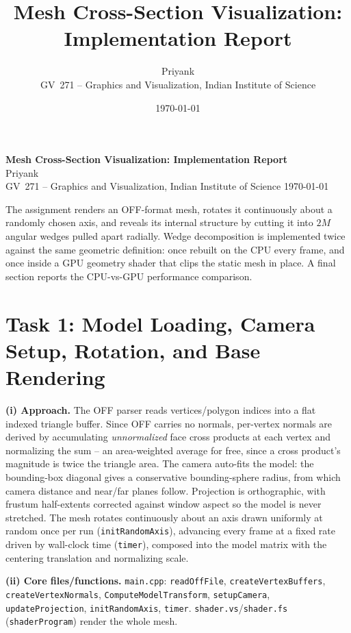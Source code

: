 \documentclass[10pt]{article}
\title{\vspace{-2em}\large Mesh Cross-Section Visualization: Implementation Report}
\author{\normalsize Priyank \\ \footnotesize GV~271 -- Graphics and Visualization, Indian Institute of Science}
\date{\footnotesize \today}
\begin{document}
\begin{center}
{\large\textbf{Mesh Cross-Section Visualization: Implementation Report}}\\[2pt]
{\normalsize Priyank}\\
{\footnotesize GV~271 -- Graphics and Visualization, Indian Institute of Science \quad\textbullet\quad \today}
\end{center}
\vspace{2pt}

\small

The assignment renders an OFF-format mesh, rotates it continuously about a randomly chosen axis, and
reveals its internal structure by cutting it into $2M$ angular wedges pulled apart radially. Wedge 
decomposition is implemented twice against the same geometric definition: once rebuilt on the CPU every 
frame, and once inside a GPU geometry shader that clips the static mesh in place. 
A final section reports the CPU-vs-GPU performance comparison.

\section{Task 1: Model Loading, Camera Setup, Rotation, and Base Rendering}
\textbf{(i) Approach.} The OFF parser reads vertices/polygon indices into a flat indexed triangle buffer. 
Since OFF carries no normals, per-vertex normals are derived by accumulating 
\emph{unnormalized} face cross products at each vertex and normalizing the sum -- 
an area-weighted average for free, since a cross product's magnitude is twice the triangle area. 
The camera auto-fits the model: the bounding-box diagonal gives a conservative bounding-sphere radius, 
from which camera distance and near/far planes follow. Projection is orthographic, with frustum half-extents corrected against window aspect so the model is never stretched. The mesh rotates continuously about an axis drawn uniformly at random once per run (\texttt{initRandomAxis}), advancing every frame at a fixed rate driven by wall-clock time (\texttt{timer}), composed into the model matrix with the centering translation and normalizing scale.

\textbf{(ii) Core files/functions.} \texttt{main.cpp}: \texttt{readOffFile}, \texttt{createVertexBuffers}, \texttt{createVertexNormals}, \texttt{ComputeModelTransform}, \texttt{setupCamera}, \texttt{updateProjection}, \texttt{initRandomAxis}, \texttt{timer}. \texttt{shader.vs}/\texttt{shader.fs} (\texttt{shaderProgram}) render the whole mesh.
\end{document}
